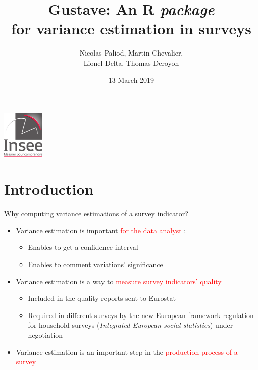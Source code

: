 \documentclass[xcolor=dvipsnames]{beamer}
\author {Nicolas Paliod, Martin Chevalier,\\Lionel Delta, Thomas Deroyon}
\title{Gustave: An R \textit{package} \\ for variance estimation in surveys}
\institute{New Techniques and Technologies for Statistics 2019}
\date{13 March 2019}
\begin{document}
\begin{frame}
\maketitle 
\begin{center}
\includegraphics[width=2cm]{logo.png}
\end{center}
\end{frame}

\section*{Introduction}

\begin{frame}{Why computing variance estimations of a survey indicator?}

\begin{itemize}
    \item Variance estimation is important \textcolor{red}{for the data analyst} :
    \begin{itemize}
        \vspace{0.1cm}
        \item Enables to get a confidence interval
        \vspace{0.1cm}
        \item Enables to comment variations' significance
    \end{itemize}
    
    \vspace{0.2cm}
    \item Variance estimation is a way to \textcolor{red}{measure survey indicators' quality}
    \begin{itemize}
        \vspace{0.1cm}
        \item Included in the quality reports sent to Eurostat
        \vspace{0.1cm}
        \item Required in different surveys by the new European framework regulation for household surveys (\textit{Integrated European social statistics}) under negotiation
    \end{itemize}
    
    \vspace{0.2cm}
   
    \item Variance estimation is an important step in the \textcolor{red}{production process of a survey}
\end{itemize}

\end{frame}
\end{document}
